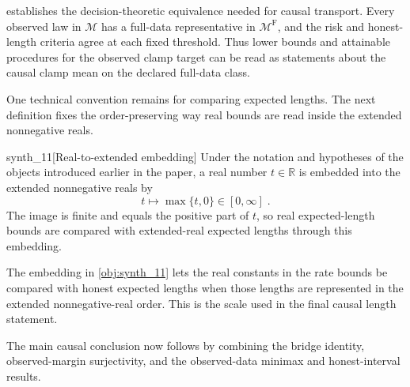 \documentclass[11pt]{article}
\begin{document}
 establishes the decision-theoretic equivalence needed for causal transport. Every observed law in \(\mathcal M\) has a full-data representative in \(\mathcal M^{\mathrm F}\), and the risk and honest-length criteria agree at each fixed threshold. Thus lower bounds and attainable procedures for the observed clamp target can be read as statements about the causal clamp mean on the declared full-data class.

One technical convention remains for comparing expected lengths. The next definition fixes the order-preserving way real bounds are read inside the extended nonnegative reals.

\begin{definitionv}{synth_11}[Real-to-extended embedding]
Under the notation and hypotheses of the objects introduced earlier in the paper, a real number \(t\in\mathbb R\) is embedded into the extended nonnegative reals by
\[
t\longmapsto \max\{t,0\}\in[0,\infty]\;.
\]
The image is finite and equals the positive part of \(t\), so real expected-length bounds are compared with extended-real expected lengths through this embedding.
\end{definitionv}

The embedding in \cref{obj:synth_11} lets the real constants in the rate bounds be compared with honest expected lengths when those lengths are represented in the extended nonnegative-real order. This is the scale used in the final causal length statement.

The main causal conclusion now follows by combining the bridge identity, observed-margin surjectivity, and the observed-data minimax and honest-interval results.
\end{document}

